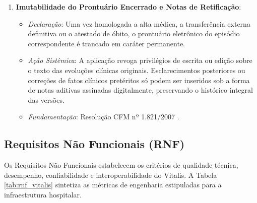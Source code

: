\begin{enumerate}[label=\textbf{RN-\arabic*:}, leftmargin=*]
    \item \textbf{Imutabilidade do Prontuário Encerrado e Notas de Retificação}:
    \begin{itemize}[noitemsep]
        \item \textit{Declaração}: Uma vez homologada a alta médica, a transferência externa definitiva ou o atestado de óbito, o prontuário eletrônico do episódio correspondente é trancado em caráter permanente.
        \item \textit{Ação Sistêmica}: A aplicação revoga privilégios de escrita ou edição sobre o texto das evoluções clínicas originais. Esclarecimentos posteriores ou correções de fatos clínicos pretéritos só podem ser inseridos sob a forma de notas aditivas assinadas digitalmente, preservando o histórico integral das versões.
        \item \textit{Fundamentação}: Resolução CFM nº 1.821/2007 \cite{cfm_prontuario:2007}.
    \end{itemize}
\end{enumerate}

\subsection{Requisitos Não Funcionais (RNF)}

Os Requisitos Não Funcionais estabelecem os critérios de qualidade técnica, desempenho, confiabilidade e interoperabilidade do Vitalis. A Tabela \ref{tab:rnf_vitalis} sintetiza as métricas de engenharia estipuladas para a infraestrutura hospitalar.

